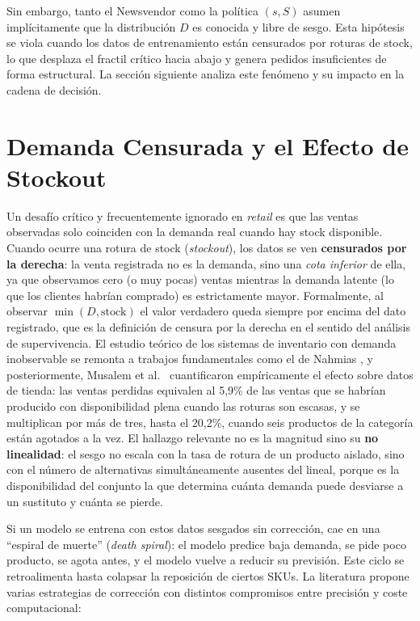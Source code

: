 Sin embargo, tanto el Newsvendor como la política $(s, S)$ asumen implícitamente que la distribución $D$ es conocida y libre de sesgo. Esta hipótesis se viola cuando los datos de entrenamiento están censurados por roturas de stock, lo que desplaza el fractil crítico hacia abajo y genera pedidos insuficientes de forma estructural. La sección siguiente analiza este fenómeno y su impacto en la cadena de decisión.

\section{Demanda Censurada y el Efecto de Stockout}
\label{sec:censura}
Un desafío crítico y frecuentemente ignorado en \textit{retail} es que las ventas observadas solo coinciden con la demanda real cuando hay stock disponible. Cuando ocurre una rotura de stock (\textit{stockout}), los datos se ven \textbf{censurados por la derecha}: la venta registrada no es la demanda, sino una \emph{cota inferior} de ella, ya que observamos cero (o muy pocas) ventas mientras la demanda latente (lo que los clientes habrían comprado) es estrictamente mayor. Formalmente, al observar $\min(D, \text{stock})$ el valor verdadero queda siempre por encima del dato registrado, que es la definición de censura por la derecha en el sentido del análisis de supervivencia. El estudio teórico de los sistemas de inventario con demanda inobservable se remonta a trabajos fundamentales como el de Nahmias \cite{nahmias1994demand}, y posteriormente, Musalem et al.\ \cite{musalem2010structural} cuantificaron empíricamente el efecto sobre datos de tienda: las ventas perdidas equivalen al 5,9\% de las ventas que se habrían producido con disponibilidad plena cuando las roturas son escasas, y se multiplican por más de tres, hasta el 20,2\%, cuando seis productos de la categoría están agotados a la vez. El hallazgo relevante no es la magnitud sino su \textbf{no linealidad}: el sesgo no escala con la tasa de rotura de un producto aislado, sino con el número de alternativas simultáneamente ausentes del lineal, porque es la disponibilidad del conjunto la que determina cuánta demanda puede desviarse a un sustituto y cuánta se pierde.

Si un modelo se entrena con estos datos sesgados sin corrección, cae en una ``espiral de muerte'' (\textit{death spiral}): el modelo predice baja demanda, se pide poco producto, se agota antes, y el modelo vuelve a reducir su previsión. Este ciclo se retroalimenta hasta colapsar la reposición de ciertos SKUs. La literatura propone varias estrategias de corrección con distintos compromisos entre precisión y coste computacional:

